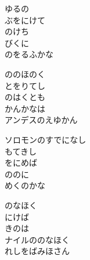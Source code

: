 \documentclass[10pt,b5j]{tarticle} %
\begin{document}
\vspace{1.5em} %
\newcommand{\linespace}{0.5em} %
\newcommand{\blocksize}{0.5\hsize} %
\begin{enumerate} %
    \begin{minipage}[c]{\blocksize}
    
        \vspace{\linespace}
        \item
        ゆるの\\
        ぶをにけて\\
        のけち\\
        びくに\\
        のをるふかな
        
        \vspace{\linespace}
        \item
        ののほのく\\
        とをりてし\\
        のはくとも\\
        かんかなは\\
        アンデスのえゆかん
        
        \vspace{\linespace}
        \item
        ソロモンのすでになし\\
        もてきし\\
        をにめば\\
        ののに\\
        めくのかな
        
        \vspace{\linespace}
        \item
        のなほく\\
        にけば\\
        きのは\\
        ナイルののなほく\\
        れしをばみほさん
        

\end{minipage}
\end{enumerate}
\end{document}

